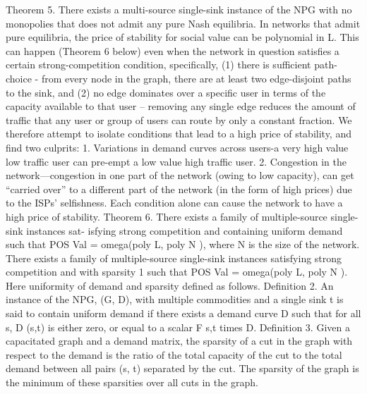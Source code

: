 \documentclass{beamer}
\begin{document}
\begin{frame}
Theorem 5. There exists a multi-source single-sink instance of the NPG with
no monopolies that does not admit any pure Nash equilibria.
In networks that admit pure equilibria, the price of stability for social value can
be polynomial in L. This can happen (Theorem 6 below) even when the network
in question satisfies a certain strong-competition condition, specifically, (1) there
is sufficient path-choice - from every node in the graph, there are at least two
edge-disjoint paths to the sink, and (2) no edge dominates over a specific user in
terms of the capacity available to that user – removing any single edge reduces
the amount of traffic that any user or group of users can route by only a constant
fraction. We therefore attempt to isolate conditions that lead to a high price of
stability, and find two culprits:
1. Variations in demand curves across users-a very high value low traffic user
can pre-empt a low value high traffic user.
2. Congestion in the network—congestion in one part of the network (owing to
low capacity), can get “carried over” to a different part of the network (in
the form of high prices) due to the ISPs’ selfishness.
Each condition alone can cause the network to have a high price of stability.
Theorem 6. There exists a family of multiple-source single-sink instances sat-
isfying strong competition and containing uniform demand such that POS Val =
omega(poly L, poly N ), where N is the size of the network. There exists a family
of multiple-source single-sink instances satisfying strong competition and with
sparsity 1 such that POS Val = omega(poly L, poly N ).
Here uniformity of demand and sparsity defined as follows.
Definition 2. An instance of the NPG, (G, D), with multiple commodities and
a single sink t is said to contain uniform demand if there exists a demand curve
D such that for all s, D (s,t) is either zero, or equal to a scalar F s,t times D.
Definition 3. Given a capacitated graph and a demand matrix, the sparsity of
a cut in the graph with respect to the demand is the ratio of the total capacity
of the cut to the total demand between all pairs (s, t) separated by the cut. The
sparsity of the graph is the minimum of these sparsities over all cuts in the graph.
\end{frame}
\end{document}
